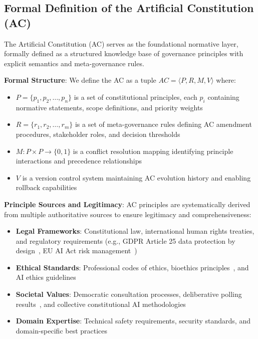 \documentclass[sigconf,review,anonymous=false]{acmart} %
\begin{document}
\subsection{Formal Definition of the Artificial Constitution (AC)}
\label{subsec:ac_formal_definition}
The Artificial Constitution (AC) serves as the foundational normative layer, formally defined as a structured knowledge base of governance principles with explicit semantics and meta-governance rules.

\textbf{Formal Structure}: We define the AC as a tuple $AC = \langle P, R, M, V \rangle$ where:
\begin{itemize}
    \item $P = \{p_1, p_2, \ldots, p_n\}$ is a set of constitutional principles, each $p_i$ containing normative statements, scope definitions, and priority weights
    \item $R = \{r_1, r_2, \ldots, r_m\}$ is a set of meta-governance rules defining AC amendment procedures, stakeholder roles, and decision thresholds
    \item $M: P \times P \rightarrow \{0, 1\}$ is a conflict resolution mapping identifying principle interactions and precedence relationships
    \item $V$ is a version control system maintaining AC evolution history and enabling rollback capabilities
\end{itemize}

\textbf{Principle Sources and Legitimacy}: AC principles are systematically derived from multiple authoritative sources to ensure legitimacy and comprehensiveness:
\begin{itemize}
    \item \textbf{Legal Frameworks}: Constitutional law, international human rights treaties, and regulatory requirements (e.g., GDPR Article 25 data protection by design~\cite{GDPRFullText}, EU AI Act risk management~\cite{EUAIAct24})
    \item \textbf{Ethical Standards}: Professional codes of ethics, bioethics principles~\cite{BeauchampTomssPrinciplesEthics}, and AI ethics guidelines~\cite{JohanssonAIEthicsLandscape23}
    \item \textbf{Societal Values}: Democratic consultation processes, deliberative polling results~\cite{FishkinDeliberativePolling}, and collective constitutional AI methodologies~\cite{AnthropicCollectiveConstitutionalAI23}
    \item \textbf{Domain Expertise}: Technical safety requirements, security standards, and domain-specific best practices
\end{itemize}
\end{document}
